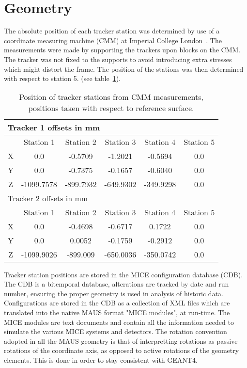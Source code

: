 \section{Geometry}
\label{sec:Geometry}

  The absolute position of each tracker station was determined by use of a coordinate measuring machine (CMM) at Imperial College London~\cite{MiceTrackers}.  The measurements were made by supporting the trackers upon blocks on the CMM. The tracker was not fixed to the supports to avoid introducing extra stresses which might distort the frame. The position of the stations was then determined with respect to station 5. (see table~\ref{tab:CMM}).
  
  \begin{table} [tbp]
  \begin{center}
  \begin{tabular} {|c|c|c|c|c|c|}
    \hline
    \multicolumn{6}{|l|}{Tracker 1 offsets in mm} \\
    \hline
    & Station 1 & Station 2 & Station 3 & Station 4 & Station 5 \\
    \hline
    X & 0.0 & -0.5709 & -1.2021 & -0.5694 & 0.0 \\
    Y & 0.0 & -0.7375 & -0.1657 & -0.6040 & 0.0 \\
    Z & -1099.7578 & -899.7932 & -649.9302 & -349.9298 & 0.0 \\
    \hline
    \hline
    \multicolumn{6}{|l|}{Tracker 2 offsets in mm} \\
    \hline
    & Station 1 & Station 2 & Station 3 & Station 4 & Station 5 \\
    \hline
    X & 0.0 & -0.4698 & -0.6717 & 0.1722 & 0.0 \\
    Y & 0.0 & 0.0052 & -0.1759 & -0.2912 & 0.0 \\
    Z & -1099.9026 & -899.009 & -650.0036 & -350.0742 & 0.0 \\
    \hline
  \end{tabular}
  \caption{\label{tab:CMM} Position of tracker stations from CMM measurements, positions taken with respect to reference surface.}
  \end{center}
  \end{table}
  
  Tracker station positions are stored in the MICE configuration database (CDB). The CDB is a bitemporal database, alterations are tracked by date and run number, ensuring the proper geometry is used in analysis of historic data.  Configurations are stored in the CDB as a collection of XML files which are translated into the native MAUS format "MICE modules", at run-time.  The MICE modules are text documents and contain all the information needed to simulate the various MICE systems and detectors. The rotation convention adopted in all the MAUS geometry is that of interpretting rotations as passive rotations of the coordinate axis, as opposed to active rotations of the geometry elements. This is done in order to stay consistent with GEANT4.
  
